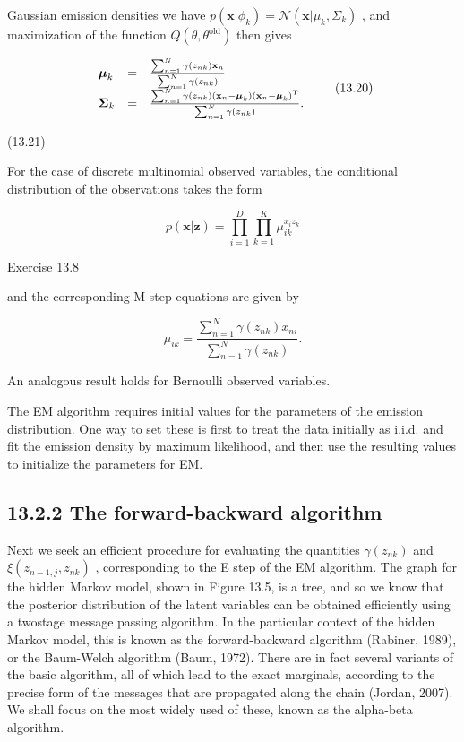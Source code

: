 \documentclass[
  10
]{article}
\begin{document}
Gaussian emission densities we have
\(p ( \mathbf { x } | \phi _ { k } ) = \mathcal { N } ( \mathbf { x } | \mu _ { k } , \Sigma _ { k } )\)
, and maximization of the function
\(Q ( \theta , \theta ^ { \mathrm { o l d } } )\) then gives

\[
\begin{array}{l l l} \boldsymbol {\mu} _ {k} & = & \frac { \sum_ {n = 1} ^ {N} \gamma (z _ {n k}) \mathbf {x} _ {n}}{ \sum_ {n = 1} ^ {N} \gamma (z _ {n k})} \\ \boldsymbol {\Sigma} _ {k} & = & \frac { \sum_ {n = 1} ^ {N} \gamma (z _ {n k}) (\mathbf {x} _ {n} - \boldsymbol {\mu} _ {k}) (\mathbf {x} _ {n} - \boldsymbol {\mu} _ {k}) ^ {\mathrm{T}}}{ \sum_ {n = 1} ^ {N} \gamma (z _ {n k})}. \end{array}\tag{13.20}
\]

(13.21)

For the case of discrete multinomial observed variables, the conditional
distribution of the observations takes the form

\[
p (\mathbf {x} | \mathbf {z}) = \prod_ {i = 1} ^ {D} \prod_ {k = 1} ^ {K} \mu_ {i k} ^ {x _ {i} z _ {k}}\tag{13.22}
\]

Exercise 13.8

and the corresponding M-step equations are given by

\[
\mu_ {i k} = \frac {\sum_ {n = 1} ^ {N} \gamma (z _ {n k}) x _ {n i}}{\sum_ {n = 1} ^ {N} \gamma (z _ {n k})}.\tag{13.23}
\]

An analogous result holds for Bernoulli observed variables.

The EM algorithm requires initial values for the parameters of the
emission distribution. One way to set these is first to treat the data
initially as i.i.d. and fit the emission density by maximum likelihood,
and then use the resulting values to initialize the parameters for EM.

\subsection{13.2.2 The forward-backward
algorithm}\label{the-forward-backward-algorithm}

Next we seek an efficient procedure for evaluating the quantities
\(\gamma ( z _ { n k } )\) and
\(\xi ( z _ { n - 1 , j } , z _ { n k } )\) , corresponding to the E
step of the EM algorithm. The graph for the hidden Markov model, shown
in Figure 13.5, is a tree, and so we know that the posterior
distribution of the latent variables can be obtained efficiently using a
twostage message passing algorithm. In the particular context of the
hidden Markov model, this is known as the forward-backward algorithm
(Rabiner, 1989), or the Baum-Welch algorithm (Baum, 1972). There are in
fact several variants of the basic algorithm, all of which lead to the
exact marginals, according to the precise form of the messages that are
propagated along the chain (Jordan, 2007). We shall focus on the most
widely used of these, known as the alpha-beta algorithm.
\end{document}

